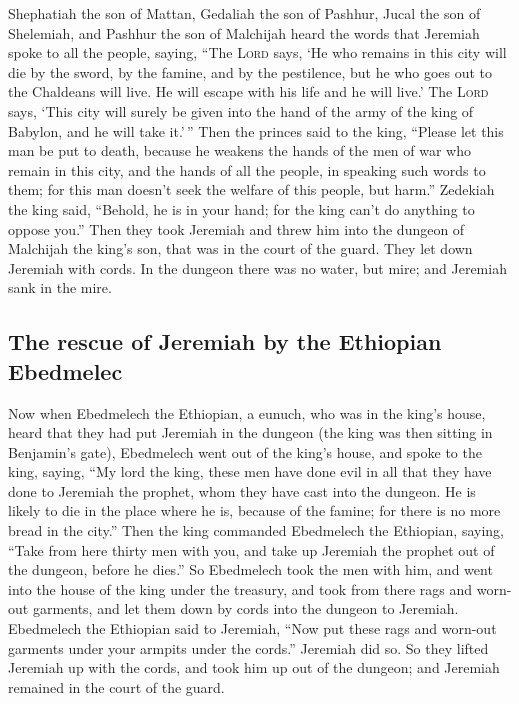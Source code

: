  Shephatiah the son of Mattan, Gedaliah the son of
Pashhur, Jucal the son of Shelemiah, and Pashhur the son of Malchijah
heard the words that Jeremiah spoke to all the people, saying,
 ``The \textsc{Lord} says, `He who remains in this city
will die by the sword, by the famine, and by the pestilence, but he who
goes out to the Chaldeans will live. He will escape with his life and he
will live.'  The \textsc{Lord} says, `This city will
surely be given into the hand of the army of the king of Babylon, and he
will take it.'\,''  Then the princes said to the king,
``Please let this man be put to death, because he weakens the hands of
the men of war who remain in this city, and the hands of all the people,
in speaking such words to them; for this man doesn't seek the welfare of
this people, but harm.''  Zedekiah the king said,
``Behold, he is in your hand; for the king can't do anything to oppose
you.''  Then they took Jeremiah and threw him into the
dungeon of Malchijah the king's son, that was in the court of the guard.
They let down Jeremiah with cords. In the dungeon there was no water,
but mire; and Jeremiah sank in the mire.

\hypertarget{the-rescue-of-jeremiah-by-the-ethiopian-ebedmelec}{%
\subsection{The rescue of Jeremiah by the Ethiopian
Ebedmelec}\label{the-rescue-of-jeremiah-by-the-ethiopian-ebedmelec}}

 Now when Ebedmelech the Ethiopian, a eunuch, who was in
the king's house, heard that they had put Jeremiah in the dungeon (the
king was then sitting in Benjamin's gate),  Ebedmelech
went out of the king's house, and spoke to the king, saying,
 ``My lord the king, these men have done evil in all that
they have done to Jeremiah the prophet, whom they have cast into the
dungeon. He is likely to die in the place where he is, because of the
famine; for there is no more bread in the city.''  Then
the king commanded Ebedmelech the Ethiopian, saying, ``Take from here
thirty men with you, and take up Jeremiah the prophet out of the
dungeon, before he dies.''  So Ebedmelech took the men
with him, and went into the house of the king under the treasury, and
took from there rags and worn-out garments, and let them down by cords
into the dungeon to Jeremiah.  Ebedmelech the Ethiopian
said to Jeremiah, ``Now put these rags and worn-out garments under your
armpits under the cords.'' Jeremiah did so.  So they
lifted Jeremiah up with the cords, and took him up out of the dungeon;
and Jeremiah remained in the court of the guard.

